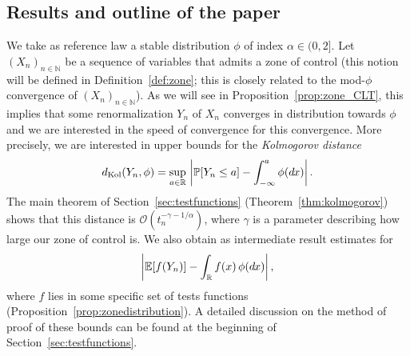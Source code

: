\documentclass[envcountsame]{svmult}
\def\O{\mathcal{O}}
\newcommand{\N}{\mathbb{N}}
\newcommand{\R}{\mathbb{R}}
\newcommand{\esper}{\mathbb{E}}
\newcommand{\proba}{\mathbb{P}}
\newcommand{\dkol}{d_\mathrm{Kol}}
\newcommand{\dwas}{d_\mathrm{W}}
\newcommand{\DD}[1]{\,d\hspace*{-0.3mm}{#1}}
\begin{document}
\subsection{Results and outline of the paper}
We take as reference law a stable distribution $\phi$ of index $\alpha \in (0,2]$.
Let $(X_n)_{n\in \N}$ be a sequence of variables that admits a zone of control
(this notion will be defined in Definition~\ref{def:zone};
this is closely related to the mod-$\phi$ convergence of $(X_n)_{n\in \N}$).
As we will see in Proposition~\ref{prop:zone_CLT},
this implies that some renormalization $Y_n$ of $X_n$ converges in distribution
towards $\phi$
and we are interested in the speed of convergence for this convergence. More precisely, we are interested in upper bounds for the \emph{Kolmogorov distance}
$$\dkol(Y_n,\phi)=\sup_{a \in \R}\, \left|\proba[Y_n \leq a]-\int_{-\infty}^a \phi(\!\DD{x})\right| .$$
The main theorem of Section~\ref{sec:testfunctions} (Theorem~\ref{thm:kolmogorov})
shows that this distance is $\O( t_n^{-\gamma-1/\alpha})$,
where $\gamma$ is a parameter describing how large our zone of control is.
We also obtain as intermediate result estimates for
$$\left|\esper[f(Y_n)]-\int_{\R} f(x)\,\phi(\!\DD{x})\right|, $$
where $f$ lies in some specific set of tests functions (Proposition~\ref{prop:zonedistribution}).
A detailed discussion on the method of proof of these bounds can be found at the beginning of Section~\ref{sec:testfunctions}.\medskip
\end{document}

